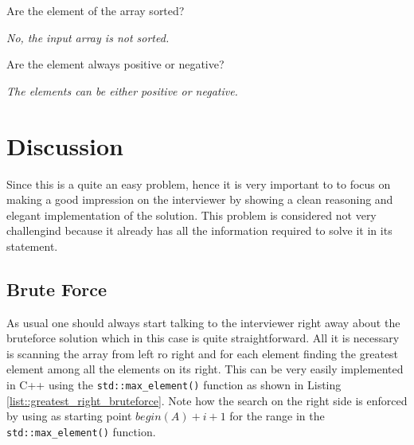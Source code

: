 \begin{QandA}
	\item \begin{questionitem} \begin{question} Are the element of the array sorted?  \end{question} 	 
    \begin{answered}
		\textit{No, the input array is not sorted.}
	\end{answered} \end{questionitem}
	
	\item \begin{questionitem} \begin{question} Are the element always positive or negative?  \end{question} 	 
    \begin{answered}
		\textit{The elements can be either positive or negative.}
	\end{answered} \end{questionitem}
	
\end{QandA}

\section{Discussion}
Since this is a quite an easy problem, hence it is very important to  to focus on making a good impression on the interviewer by showing a clean reasoning and elegant implementation of the solution. This problem is considered not very challengind because it already has all the information required to solve it in its statement. 

\subsection{Brute Force}
As usual one should always start talking to the interviewer right away about the bruteforce solution which in this case is quite straightforward. All it is necessary is scanning the array from left ro right and for each element finding the greatest element among all the elements on its right.
This can be very easily implemented in C++ using the \texttt{std::max\_element()} function as shown in Listing \ref{list::greatest_right_bruteforce}. Note how the search on the right side is enforced by using as starting point $begin(A)+i+1$ for the range in the \texttt{std::max\_element()} function.

	



